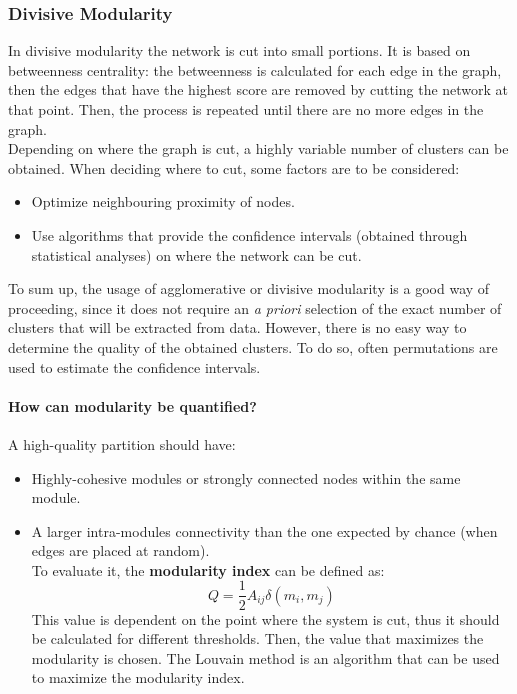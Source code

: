 \subsubsection{Divisive Modularity}
In divisive modularity the network is cut into small portions.
It is based on betweenness centrality: the betweenness is calculated for each edge in the graph, then the edges
that have the highest score are removed by cutting the network at that point. Then, the process is repeated until there are
no more edges in the graph.\\
Depending on where the graph is cut, a highly variable number of clusters can be obtained. When deciding where to cut, some
factors are to be considered:
\begin{itemize}
    \item Optimize neighbouring proximity of nodes.
    \item Use algorithms that provide the confidence intervals (obtained through statistical analyses) on where the
          network can be cut.
\end{itemize}
To sum up, the usage of agglomerative or divisive modularity is a good way of proceeding, since it does not require
an \textit{a priori} selection of the exact number of clusters that will be extracted from data. However, there is no
easy way to determine the quality of the obtained clusters. To do so, often permutations are used to estimate the
confidence intervals.
\paragraph{How can modularity be quantified?} A high-quality partition should have:
\begin{itemize}
    \item Highly-cohesive modules or strongly connected nodes within the same module.
    \item A larger intra-modules connectivity than the one expected by chance (when edges are placed at random).\\
          To evaluate it, the \textbf{modularity index} can be defined as:
          \begin{equation*}
              Q=\frac{1}{2}A_{ij}\delta(m_i,m_j)
          \end{equation*}
          This value is dependent on the point where the system is cut, thus it should be calculated for
          different thresholds. Then, the value that maximizes the modularity is chosen.
          The Louvain method is an algorithm that can be used to maximize the modularity index.
\end{itemize}

